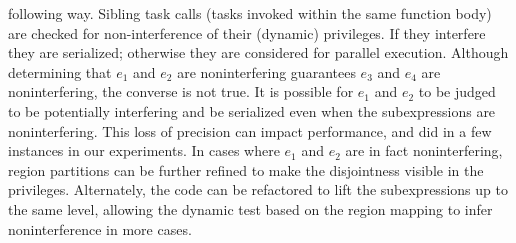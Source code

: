 following way.  Sibling task calls (tasks invoked within the same
function body) are checked for non-interference of their (dynamic)
privileges.  If they interfere they are serialized; otherwise they are
considered for parallel execution.  Although determining that $e_1$
and $e_2$ are noninterfering guarantees $e_3$ and $e_4$ are
noninterfering, the converse is not true.  It is possible for $e_1$
and $e_2$ to be judged to be potentially interfering and be serialized
even when the subexpressions are noninterfering.  This loss of
precision can impact performance, and did in a few instances in our
experiments.  
In cases where $e_1$ and $e_2$ are in fact
noninterfering, region partitions can be further refined to make the
disjointness visible in the privileges.  Alternately, the code can be
refactored to lift the subexpressions up to the same level, allowing
the dynamic test based on the region mapping to infer noninterference
in more cases.  

